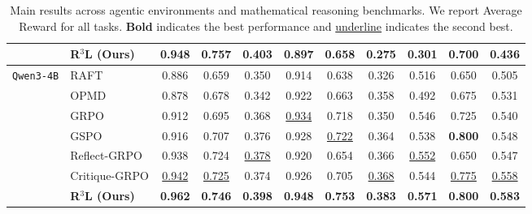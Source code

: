 \begin{table}[t]
{\begin{tabular}{ll ccc cccccc}
\rowcolor{cyan!10} & \textbf{R$^3$L (Ours)} & \textbf{0.948} & \textbf{0.757} & \textbf{0.403} & \textbf{0.897} & \textbf{0.658} & \textbf{0.275} & \textbf{0.301} & \textbf{0.700} & \textbf{0.436} \\
\midrule
\multirow{7}{*}{\texttt{Qwen3-4B}}
& RAFT & 0.886 & 0.659 & 0.350 & 0.914 & 0.638 & 0.326 & 0.516 & 0.650 & 0.505 \\
& OPMD & 0.878 & 0.678 & 0.342 & 0.922 & 0.663 & 0.358 & 0.492 & 0.675 & 0.531 \\
& GRPO & 0.912 & 0.695 & 0.368 & \underline{0.934} & 0.718 & 0.350 & 0.546 & 0.725 & 0.540 \\
& GSPO & 0.916 & 0.707 & 0.376 & 0.928 & \underline{0.722} & 0.364 & 0.538 & \textbf{0.800} & 0.548 \\
& Reflect-GRPO & 0.938 & 0.724 & \underline{0.378} & 0.920 & 0.654 & 0.366 & \underline{0.552} & 0.650 & 0.547 \\
& Critique-GRPO & \underline{0.942} & \underline{0.725} & 0.374 & 0.926 & 0.705 & \underline{0.368} & 0.544 & \underline{0.775} & \underline{0.558} \\
\rowcolor{cyan!10} & \textbf{R$^3$L (Ours)} & \textbf{0.962} & \textbf{0.746} & \textbf{0.398} & \textbf{0.948} & \textbf{0.753} & \textbf{0.383} & \textbf{0.571} & \textbf{0.800} & \textbf{0.583} \\
\bottomrule
\end{tabular}
}
\caption{Main results across agentic environments and mathematical reasoning benchmarks. We report Average Reward for all tasks. \textbf{Bold} indicates the best performance and \underline{underline} indicates the second best.}
\label{tab:main_results}
\vspace{-0.5em}
\end{table}
